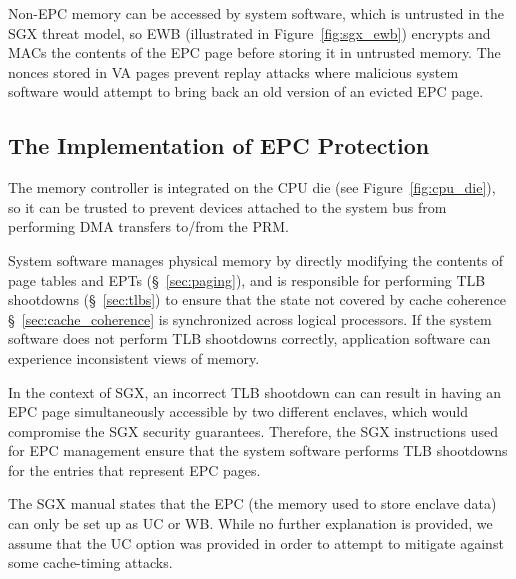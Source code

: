 Non-EPC memory can be accessed by system software, which is untrusted in the
SGX threat model, so EWB (illustrated in Figure~\ref{fig:sgx_ewb}) encrypts and
MACs the contents of the EPC page before storing it in untrusted memory. The
nonces stored in VA pages prevent replay attacks where malicious system
software would attempt to bring back an old version of an evicted EPC page.


\subsection {The Implementation of EPC Protection}

The memory controller is
integrated on the CPU die (see Figure~\ref{fig:cpu_die}), so it can be trusted
to prevent devices attached to the system bus from performing DMA transfers
to/from the PRM.

System software manages physical memory by directly modifying the contents of
page tables and EPTs (\S~\ref{sec:paging}), and is responsible for performing
TLB shootdowns (\S~\ref{sec:tlbs}) to ensure that the state not covered by
cache coherence \S~\ref{sec:cache_coherence} is synchronized across logical
processors. If the system software does not perform TLB shootdowns correctly,
application software can experience inconsistent views of memory.

In the context of SGX, an incorrect TLB shootdown can can result in having an
EPC page simultaneously accessible by two different enclaves, which would
compromise the SGX security guarantees. Therefore, the SGX instructions used
for EPC management ensure that the system software performs TLB shootdowns for
the entries that represent EPC pages.


The SGX manual states that the EPC (the memory used to store enclave data) can
only be set up as UC or WB. While no further explanation is provided, we assume
that the UC option was provided in order to attempt to mitigate against some
cache-timing attacks.

